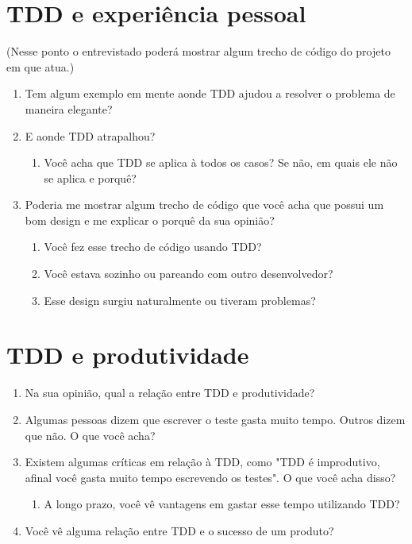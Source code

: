 \section{TDD e experiência pessoal}

(Nesse ponto o entrevistado poderá mostrar algum trecho de código do projeto em que atua.)

\begin{enumerate}
	\item Tem algum exemplo em mente aonde TDD ajudou a resolver o problema de maneira elegante?
	\item E aonde TDD atrapalhou?
		\begin{enumerate}
			\item Você acha que TDD se aplica à todos os casos? Se não, em quais ele não se aplica e porquê?
		\end{enumerate}
	\item Poderia me mostrar algum trecho de código que você acha que possui um bom design e me explicar o porquê da sua opinião?
		\begin{enumerate}
			\item Você fez esse trecho de código usando TDD?
			\item Você estava sozinho ou pareando com outro desenvolvedor?
			\item Esse design surgiu naturalmente ou tiveram problemas?
		\end{enumerate}
\end{enumerate}

\section{TDD e produtividade}
\begin{enumerate}
	\item Na sua opinião, qual a relação entre TDD e produtividade?
	\item Algumas pessoas dizem que escrever o teste gasta muito tempo. Outros dizem que não. O que você acha?
	\item Existem algumas críticas em relação à TDD, como "TDD é improdutivo, afinal você gasta muito tempo escrevendo os testes". O que você acha disso?
		\begin{enumerate}
			\item A longo prazo, você vê vantagens em gastar esse tempo utilizando TDD?
		\end{enumerate}
	\item Você vê alguma relação entre TDD e o sucesso de um produto?
\end{enumerate}

